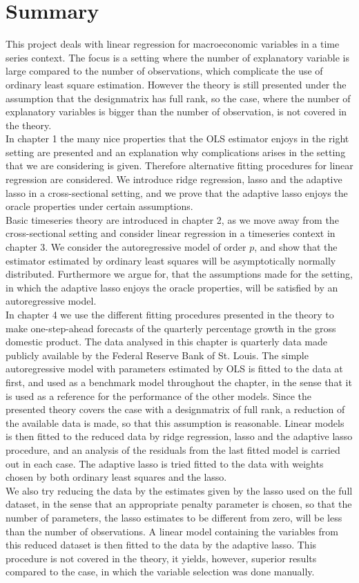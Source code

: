 \chapter{Summary}
This project deals with linear regression for macroeconomic variables in a time series context. The focus is a setting where the number of explanatory variable is large compared to the number of observations, which complicate the use of ordinary least square estimation. However the theory is still presented under the assumption that the designmatrix has full rank, so the case, where the number of explanatory variables is bigger than the number of observation, is not covered in the theory.\\
In chapter 1 the many nice properties that the OLS estimator enjoys in the right setting are presented and an explanation why complications arises in the setting that we are considering is given. Therefore alternative fitting procedures for linear regression are considered. We introduce ridge regression, lasso and the adaptive lasso  in a cross-sectional setting, and we prove that the adaptive lasso enjoys the oracle properties under certain assumptions. \\
Basic timeseries theory are introduced in chapter 2, as we move away from the cross-sectional setting and consider linear regression in a timeseries context in chapter 3. We consider the autoregressive model of order $p$, and show that the estimator estimated by ordinary least squares will be asymptotically normally distributed. Furthermore we argue for, that the assumptions made for the setting, in which the adaptive lasso enjoys the oracle properties, will be satisfied by an autoregressive model.\\
In chapter 4 we use the different fitting procedures presented in the theory to make one-step-ahead forecasts of the quarterly percentage growth in the gross domestic product. The data analysed in this chapter is quarterly data made publicly available by the Federal Reserve Bank of St. Louis. The simple autoregressive model with parameters estimated by OLS is fitted to the data at first, and used as a benchmark model throughout the chapter, in the sense that it is used as a reference for the performance of the other models. Since the presented theory covers the case with a designmatrix of full rank, a reduction of the available data is made, so that this assumption is reasonable. Linear models is then fitted to the reduced data by ridge regression, lasso and the adaptive lasso procedure, and an analysis of the residuals from the last fitted model is carried out in each case. The adaptive lasso is tried fitted to the data with weights chosen by both ordinary least squares and the lasso. \\
We also try reducing the data by the estimates given by the lasso used on the full dataset, in the sense that an appropriate penalty parameter is chosen, so that the number of parameters, the lasso estimates to be different from zero, will be less than the number of observations. A linear model containing the variables from this reduced dataset is then fitted to the data by the adaptive lasso. This procedure is not covered in the theory, it yields, however, superior results compared to the case, in which the variable selection was done manually.              